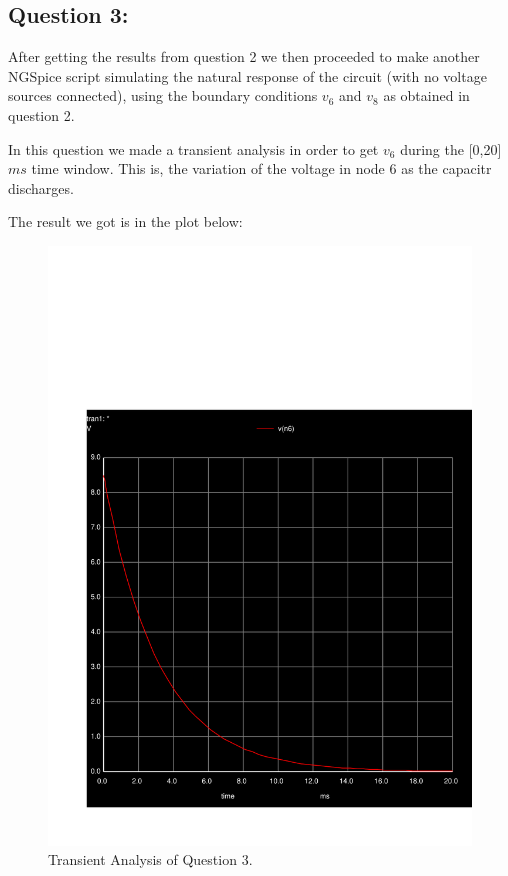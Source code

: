 \subsection{Question 3: }
After getting the results from question 2 we then proceeded to make another NGSpice script simulating the natural response of the circuit (with no voltage sources connected), using the boundary conditions $v_6$ and $v_8$ as obtained in question 2. \par
In this question we made a transient analysis in order to get $v_6$ during the [0,20] $ms$ time window. This is, the variation of the voltage in node 6 as the capacitr discharges. \par
The result we got is in the plot below:
\begin{figure}[H] \centering
\includegraphics[width=0.7\linewidth]{../sim/transient3.pdf}
\caption{Transient Analysis of Question 3.}
\label{fig:transient3}
\end{figure}

